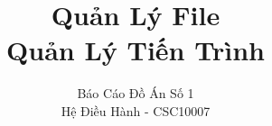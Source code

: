 \documentclass{reportDoCS2025}
\title{Quản Lý File \\ Quản Lý Tiến Trình}
\subtitle{Báo Cáo Đồ Án Số 1 \\ Hệ Điều Hành - CSC10007}
\begin{document}
\cover
\numRoman

% 



\contents

% 

\pageNumber








% 




\listTables
\listImages
\end{document}
